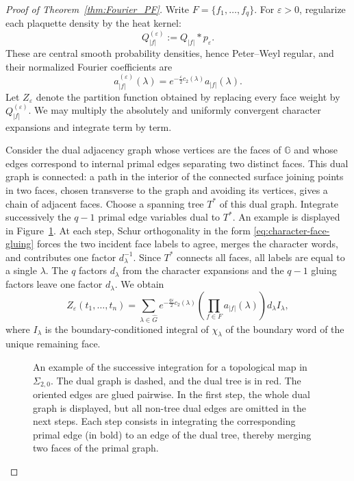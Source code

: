 \documentclass[10pt,a4paper]{amsart}
\begin{document}
\begin{proof}[Proof of Theorem~\ref{thm:Fourier_PF}]
Write $F=\{f_1,\ldots,f_q\}$. For $\varepsilon>0$, regularize each
plaquette density by the heat kernel:
\[
 Q_{|f|}^{(\varepsilon)}
 :=Q_{|f|}*p_\varepsilon.
\]
These are central smooth probability densities, hence Peter--Weyl
regular, and their normalized Fourier coefficients are
\[
 a_{|f|}^{(\varepsilon)}(\lambda)
 =e^{-\frac{\varepsilon}{2}c_2(\lambda)}
 a_{|f|}(\lambda).
\]
Let $Z_\varepsilon$ denote the partition function obtained by replacing
every face weight by $Q_{|f|}^{(\varepsilon)}$. We may multiply the
absolutely and uniformly convergent character expansions and integrate
term by term.

Consider the dual adjacency graph whose vertices are the faces of
$\mathbb G$ and whose edges correspond to internal primal edges separating
two distinct faces. This dual graph is connected: a
path in the interior of the connected surface joining points in two
faces, chosen transverse to the graph and avoiding its vertices, gives a
chain of adjacent faces. Choose a spanning tree $T^*$ of this dual graph.
Integrate successively the $q-1$ primal edge variables dual to $T^*$. An example is displayed in Figure~\ref{fig:tree-integration}. At
each step, Schur orthogonality in the form
\eqref{eq:character-face-gluing} forces the two incident face labels to
agree, merges the character words, and contributes one factor
$d_\lambda^{-1}$. Since $T^*$ connects all faces, all labels are equal to
a single $\lambda$. The $q$ factors $d_\lambda$ from the character
expansions and the $q-1$ gluing factors leave one factor $d_\lambda$. We
obtain
\begin{equation}\label{eq:PF-one-face-intermediate}
 Z_\varepsilon(t_1,\ldots,t_n)
 =
 \sum_{\lambda\in\widehat G}
 e^{-\frac{q\varepsilon}{2}c_2(\lambda)}
 \left(\prod_{f\in F}a_{|f|}(\lambda)\right)d_\lambda I_\lambda,
\end{equation}
where $I_\lambda$ is the boundary-conditioned integral of
$\chi_\lambda$ of the boundary word of the unique remaining face.

\begin{figure}[h!]
 \centering
 
 \caption{An example of the successive integration for a topological map in $\Sigma_{2,0}$. The dual graph is dashed, and the dual tree is in red. The oriented edges are glued pairwise. In the first step, the whole dual graph is displayed, but all non-tree dual edges are omitted in the next steps. Each step consists in integrating the corresponding primal edge (in bold) to an edge of the dual tree, thereby merging two faces of the primal graph.}
 \label{fig:tree-integration}
\end{figure}


\end{proof}
\end{document}
